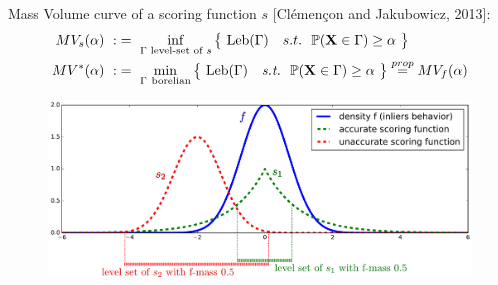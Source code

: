 \documentclass[9pt]{beamer}
\newcommand{\st}{\text{\emph{s.t.}}{}}
\newcommand\blue{\color{blue} }
\def\mb{\mathbf}
\def\leb{\text{Leb}}
\begin{document}
\begin{frame}
{\blue Mass Volume curve} of a scoring function $s$ {\small [Clémençon and Jakubowicz, 2013]}:
\begin{align*}
MV_s(\alpha) ~:&=~ \inf_{\Gamma \text{ level-set of } s} \big\{~ \leb(\Gamma) ~~~s.t.~~ \mathbb{P}(\mb X \in \Gamma) \ge \alpha~\big\} \\
MV^*(\alpha) ~:&=~ \min_{\Gamma~ \text{borelian}} \big\{~\leb(\Gamma) ~~~\st~~ \mathbb{P}(\mb X \in \Gamma) \ge \alpha ~\big\} \overset{prop}{=} MV_f(\alpha)
\end{align*}
%
\begin{figure}[htb]
\centering
\includegraphics[width=0.87\columnwidth]{sourcefigs/scoring2.pdf}
\end{figure}

\end{frame}






\end{document}
